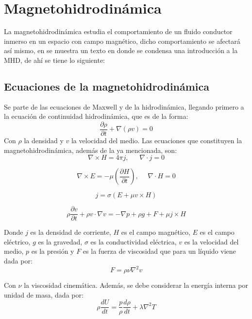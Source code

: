 \section{Magnetohidrodinámica}
La magnetohidrodinámica estudia el comportamiento de un fluido conductor inmerso en un espacio con campo magnético, dicho comportamiento se afectará así mismo, en \cite{cowling-1976} se muestra un texto en donde se condensa una introducción a la MHD, de ahí se tiene lo siguiente:

\subsection{Ecuaciones de la magnetohidrodinámica}

Se parte de las ecuaciones de Maxwell y de la hidrodinámica, llegando primero a la ecuación de continuidad hidrodinámica, que es de la forma:
\begin{equation}
\frac{\partial \rho}{\partial t}+\nabla(\rho v)=0
\end{equation}
Con $\rho$ la densidad y $v$ la velocidad del medio.
Las ecuaciones que constituyen la magnetohidrodinámica, además de la ya mencionada, son:
\begin{equation}
\nabla \times H=4\pi j,   ~~~~~~~\nabla \cdot j=0
\end{equation}


\begin{equation}
\nabla \times E=-\mu(\frac{\partial H}{\partial t}),~~~~~~\nabla \cdot H=0
\end{equation}

\begin{equation}
j=\sigma(E+\mu v\times H)
\end{equation}

\begin{equation}
\rho\frac{\partial v}{\partial t}+\rho v\cdot \nabla v=-\nabla p+\rho g+F+\mu j\times H
\end{equation}

Donde $j$ es la densidad de corriente, $H$ es el campo magnético, $E$ es el campo eléctrico, $g$ es la gravedad, $\sigma$ es la conductividad eléctrica, $v$ es la velocidad del medio, $p$ es la presión y $F$ es la fuerza de viscosidad que para un líquido viene dada por:
\begin{equation}
F=\rho \nu \nabla^{2}v
\end{equation}

Con $\nu$ la viscosidad cinemática.
Además, se debe considerar la energía interna por unidad de masa, dada por:
\begin{equation}
\rho\frac{dU}{dt}=\frac{p}{\rho}\frac{d\rho}{dt}+\lambda \nabla ^{2}T
\end{equation}

